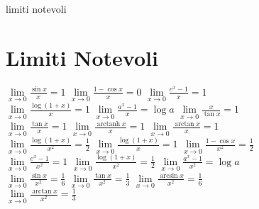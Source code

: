 limiti notevoli
\section{Limiti Notevoli}   
$\lim\limits_{x \to 0} \frac{\sin x}{x} = 1$ \qquad \qquad \qquad \qquad
$\lim\limits_{x \to 0} \frac{1 - \cos x}{x} = 0$ \qquad \qquad \qquad \qquad
$\lim\limits_{x \to 0} \frac{e^x - 1}{x} = 1$\\
$\lim\limits_{x \to 0} \frac{\log(1 + x)}{x} = 1$ \qquad \qquad \qquad \qquad
$\lim\limits_{x \to 0} \frac{a^x - 1}{x} = \log a$ \qquad \qquad \qquad \qquad
$\lim\limits_{x \to 0} \frac{x}{\tan x} = 1$\\
$\lim\limits_{x \to 0} \frac{\tan x}{x} = 1$ \qquad \qquad \qquad \qquad
$\lim\limits_{x \to 0} \frac{\operatorname{arctanh} x}{x} = 1$ \qquad \qquad \qquad \qquad
$\lim\limits_{x \to 0} \frac{\arctan x}{x} = 1$\\
$\lim\limits_{x \to 0} \frac{\log(1 + x)}{x^2} = \frac{1}{2}$ \qquad \qquad \qquad \qquad
$\lim\limits_{x \to 0} \frac{\log(1 + x)}{x} = 1$ \qquad \qquad \qquad \qquad
$\lim\limits_{x \to 0} \frac{1 - \cos x}{x^2} = \frac{1}{2}$\\
$\lim\limits_{x \to 0} \frac{e^x - 1}{x^2} = 1$ \qquad \qquad \qquad \qquad
$\lim\limits_{x \to 0} \frac{\log(1 + x)}{x^2} = \frac{1}{2}$ \qquad \qquad \qquad \qquad
$\lim\limits_{x \to 0} \frac{a^x - 1}{x^2} = \log a$\\
$\lim\limits_{x \to 0} \frac{\sin x}{x^2} = \frac{1}{6}$ \qquad \qquad \qquad \qquad
$\lim\limits_{x \to 0} \frac{\tan x}{x^2} = \frac{1}{3}$ \qquad \qquad \qquad \qquad
$\lim\limits_{x \to 0} \frac{\arcsin x}{x^2} = \frac{1}{6}$\\
$\lim\limits_{x \to 0} \frac{\arctan x}{x^2} = \frac{1}{3}$ \qquad \qquad \qquad \qquad

